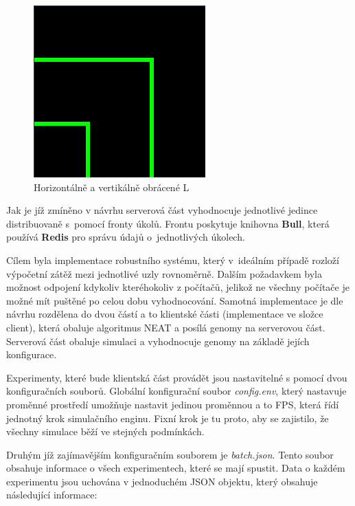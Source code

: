 \begin{figure}[H]
	\centering
	\includegraphics[scale=0.6]{pieces/inverted_upside_L}
	\caption{Horizontálně a vertikálně obrácené L}
	\label{fig:invertedupsidel}
\end{figure}

Jak je jíž zmíněno v návrhu serverová část vyhodnocuje jednotlivé jedince distribuovaně s~pomocí fronty úkolů. Frontu poskytuje knihovna \textbf{Bull}, která používá \textbf{Redis} pro správu údajů o~jednotlivých úkolech. 

Cílem byla implementace robustního systému, který v~ideálním případě rozloží výpočetní zátěž mezi jednotlivé uzly rovnoměrně. Dalším požadavkem byla možnost odpojení kdykoliv kteréhokoliv z počítačů, jelikož ne všechny počítače je možné mít puštěné po celou dobu vyhodnocování.
Samotná implementace je dle návrhu rozdělena do dvou částí a to klientské části (implementace ve složce client), která obaluje algoritmus NEAT a posílá genomy na serverovou část. Serverová část obaluje simulaci a vyhodnocuje genomy na základě jejích konfigurace.

Experimenty, které bude klientská část provádět jsou nastavitelné s pomocí dvou konfiguračních souborů.
Globální konfigurační soubor \emph{config.env}, který nastavuje proměnné prostředí umožňuje nastavit jedinou proměnnou a to FPS, která řídí jednotný krok simulačního enginu. Fixní krok je tu proto, aby se zajistilo, že všechny simulace běží ve stejných podmínkách.

Druhým jíž zajímavějším konfiguračním souborem je \emph{batch.json}. Tento soubor obsahuje informace o všech experimentech, které se mají spustit. Data o každém experimentu jsou uchována v jednoduchém JSON objektu, který obsahuje následující informace:

